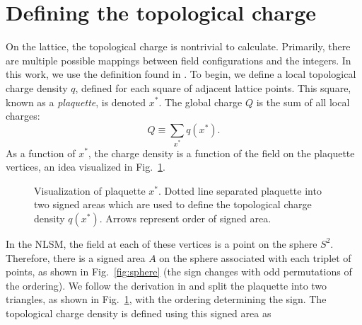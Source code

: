 \section{Defining the topological charge}
On the lattice, the topological charge is nontrivial to calculate. Primarily, there are multiple possible mappings between field configurations and the integers. In this work, we use the definition found in \cite{berg1981}. To begin, we define a local topological charge density $q$, defined for each square of adjacent lattice points. This square, known as a \textit{plaquette}, is denoted $x^*$. The global charge $Q$ is the sum of all local charges:
\begin{equation}
    Q \equiv \sum_{x^*} q(x^*).
\end{equation}
As a function of $x^*$, the charge density is a function of the field on the plaquette vertices, an idea visualized in Fig.~\ref{fig:plaquette}.
\begin{figure}
    \centering
    \caption{\label{fig:plaquette} Visualization of plaquette $x^*$. Dotted line separated plaquette into two signed areas which are used to define the topological charge density $q(x^*)$. Arrows represent order of signed area.}
\end{figure}
In the NLSM, the field at each of these vertices is a point on the sphere $S^2$. Therefore, there is a signed area $A$ on the sphere associated with each triplet of points, as shown in Fig.~\ref{fig:sphere} (the sign changes with odd permutations of the ordering). We follow the derivation in \cite{berg1981} and split the plaquette into two triangles, as shown in Fig.~\ref{fig:plaquette}, with the ordering determining the sign. The topological charge density is defined using this signed area as
